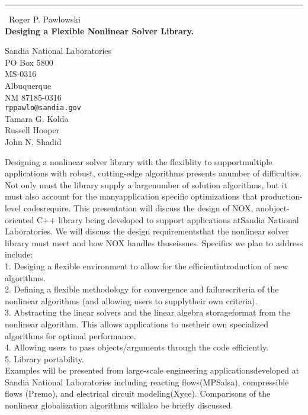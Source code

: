 \documentclass{report}
\begin{document}
\begin{center}
\rule{6in}{1pt} \
{\large Roger P. Pawlowski \\
{\bf Desiging a Flexible Nonlinear Solver Library.}}

Sandia National Laboratories \\ PO Box 5800 \\ MS-0316 \\ Albuquerque \\ NM 87185-0316
\\
{\tt rppawlo@sandia.gov}\\
Tamara G. Kolda\\
Russell Hooper\\
	John N. Shadid\end{center}

Designing a nonlinear solver library with the flexiblity to supportmultiple applications with robust,
cutting-edge algorithms presents anumber of difficulties.
Not only must the library supply a largenumber of solution algorithms,
but it must also account for the manyapplication specific optimizations that production-level codesrequire.
This presentation will discuss the design of NOX,
anobject-oriented C++ library being developed to support applications atSandia National Laboratories.
We will discuss the design requirementsthat the nonlinear solver library must meet and how NOX handles thoseissues.
Specifics we plan to address include: \\1.
Desiging a flexible environment to allow for the efficientintroduction of new algorithms.
\\2.
Defining a flexible methodology for convergence and failurecriteria of the nonlinear algorithms (and allowing users to supplytheir own criteria).
\\3.
Abstracting the linear solvers and the linear algebra storageformat from the nonlinear algorithm.
This allows applications to usetheir own specialized algorithms for optimal performance.
\\4.
Allowing users to pass objects/arguments through the code efficiently.
\\5.
Library portability.
\\Examples will be presented from large-scale engineering applicationsdeveloped at Sandia National Laboratories including reacting flows(MPSalsa),
compressible flows (Premo),
and electrical circuit modeling(Xyce).
Comparisons of the nonlinear globalization algorithms willalso be briefly discussed.
\end{document}
